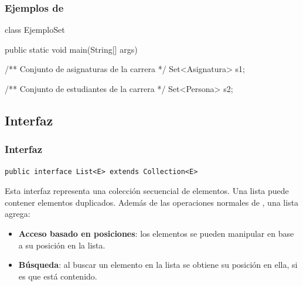 \documentclass{beamer}
\begin{document}
\begin{frame}[fragile]
  \frametitle{Ejemplos de }

  \begin{jsmall}
    class EjemploSet {
      public static void main(String[] args) {
        /** Conjunto de asignaturas de la carrera */        
        Set<Asignatura> s1;

        /** Conjunto de estudiantes de la carrera */        
        Set<Persona> s2;        
      }
    }    
  \end{jsmall}
  
\end{frame}

\subsection{Interfaz }

\begin{frame}[fragile]
  \frametitle{Interfaz }

\begin{verbatim}
public interface List<E> extends Collection<E>
\end{verbatim}

  Esta interfaz representa una colección secuencial de elementos. Una
  lista puede contener elementos duplicados. Además de las operaciones
  normales de , una lista agrega:

  \begin{itemize}

  \item \textbf{Acceso basado en posiciones}: los elementos se pueden
    manipular en base a su posición en la lista.

  \item \textbf{Búsqueda}: al buscar un elemento en la lista se
    obtiene su posición en ella, si es que está contenido.
    
  \end{itemize}  
  
\end{frame}
\end{document}
